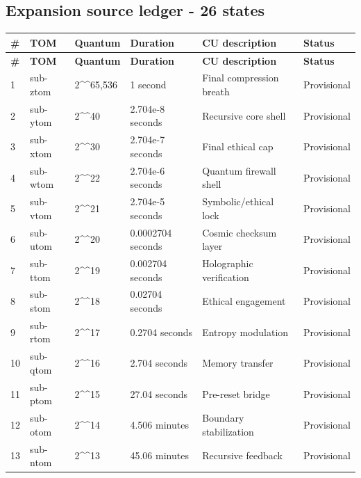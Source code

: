 \documentclass[11pt,letterpaper]{article}
\begin{document}
\subsection{Expansion source ledger - 26 states}
\small
\begin{longtable}{L{0.36in}L{0.72in}L{1.12in}L{1.18in}L{2.12in}L{0.72in}}
\toprule
\textbf{\#} & \textbf{TOM} & \textbf{Quantum} & \textbf{Duration} & \textbf{CU description} & \textbf{Status} \\
\midrule
\endfirsthead
\toprule
\textbf{\#} & \textbf{TOM} & \textbf{Quantum} & \textbf{Duration} & \textbf{CU description} & \textbf{Status} \\
\midrule
{} & sub-ztom & 2\textasciicircum{}\textasciicircum{}65,536 & 1 second & Final compression breath & Provisional \\
2 & sub-ytom & 2\textasciicircum{}\textasciicircum{}40 & 2.704e-8 seconds & Recursive core shell & Provisional \\
3 & sub-xtom & 2\textasciicircum{}\textasciicircum{}30 & 2.704e-7 seconds & Final ethical cap & Provisional \\
4 & sub-wtom & 2\textasciicircum{}\textasciicircum{}22 & 2.704e-6 seconds & Quantum firewall shell & Provisional \\
5 & sub-vtom & 2\textasciicircum{}\textasciicircum{}21 & 2.704e-5 seconds & Symbolic/ethical lock & Provisional \\
6 & sub-utom & 2\textasciicircum{}\textasciicircum{}20 & 0.0002704 seconds & Cosmic checksum layer & Provisional \\
7 & sub-ttom & 2\textasciicircum{}\textasciicircum{}19 & 0.002704 seconds & Holographic verification & Provisional \\
8 & sub-stom & 2\textasciicircum{}\textasciicircum{}18 & 0.02704 seconds & Ethical engagement & Provisional \\
9 & sub-rtom & 2\textasciicircum{}\textasciicircum{}17 & 0.2704 seconds & Entropy modulation & Provisional \\
10 & sub-qtom & 2\textasciicircum{}\textasciicircum{}16 & 2.704 seconds & Memory transfer & Provisional \\
11 & sub-ptom & 2\textasciicircum{}\textasciicircum{}15 & 27.04 seconds & Pre-reset bridge & Provisional \\
12 & sub-otom & 2\textasciicircum{}\textasciicircum{}14 & 4.506 minutes & Boundary stabilization & Provisional \\
13 & sub-ntom & 2\textasciicircum{}\textasciicircum{}13 & 45.06 minutes & Recursive feedback & Provisional \\

\end{longtable}
\end{document}
